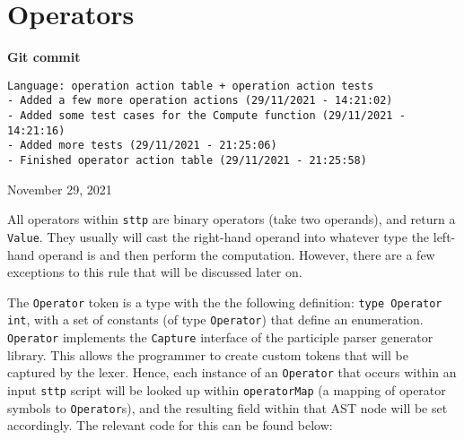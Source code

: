 \section{Operators}
\label{sec:development-operators}

\begin{center}
    \textbf{Git commit}
    \begin{verbatim}
Language: operation action table + operation action tests
- Added a few more operation actions (29/11/2021 - 14:21:02)
- Added some test cases for the Compute function (29/11/2021 - 14:21:16)
- Added more tests (29/11/2021 - 21:25:06)
- Finished operator action table (29/11/2021 - 21:25:58)
    \end{verbatim}
    \vspace{-1em}
    \tiny{November 29, 2021}
\end{center}

All operators within \verb|sttp| are binary operators (take two operands), and return a \verb|Value|. They usually will cast the right-hand operand into whatever type the left-hand operand is and then perform the computation. However, there are a few exceptions to this rule that will be discussed later on.

The \verb|Operator| token is a type with the the following definition: \texttt{type Operator int}, with a set of constants (of type \verb|Operator|) that define an enumeration. \verb|Operator| implements the \verb|Capture| interface of the participle parser generator library. This allows the programmer to create custom tokens that will be captured by the lexer. Hence, each instance of an \verb|Operator| that occurs within an input \verb|sttp| script will be looked up within \verb|operatorMap| (a mapping of operator symbols to \verb|Operator|s), and the resulting field within that AST node will be set accordingly. The relevant code for this can be found below:

\inputminted[firstline=13, lastline=71, autogobble, breaklines, tabsize=4]{go}{../../src/eval/operators.go}

